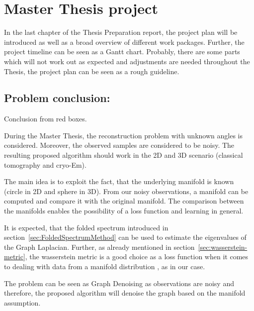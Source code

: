 \chapter{Master Thesis project}
\label{sec:projectOverview}
In the last chapter of the Thesis Preparation report, the project plan will be introduced as well as a broad overview of different 
work packages. Further, the project timeline can be seen as a Gantt chart.
Probably, there are some parts which will not work out as expected and 
adjustments are needed throughout the Thesis, the project plan can be seen as a rough guideline.

\section{Problem conclusion:}
Conclusion from red boxes.

During the Master Thesis, the reconstruction problem with unknown angles is considered. 
Moreover, the observed samples are considered to be noisy. 
The resulting proposed algorithm should work in the 2D and 3D scenario (classical tomography and cryo-Em).

The main idea is to exploit the fact, that the underlying manifold is known (circle in 2D and sphere in 3D). 
From our noisy observations, a manifold can be computed and compare it with the original manifold.
The comparison between the manifolds enables the possibility of a loss function and learning in general.

It is expected, that the folded spectrum \cite{foldedSpectrumMethod} introduced in section~\ref{sec:FoldedSpectrumMethod}
can be used to estimate the eigenvalues of the Graph Laplacian.
Further, as already mentioned in section~\ref{sec:wasserstein-metric}, the wasserstein metric is a good choice
as a loss function when it comes to dealing with data from a manifold distribution \cite{wassersteinGAN}, as in our case. 

The problem can be seen as Graph Denoising as observations are noisy and therefore, the proposed algorithm 
will denoise the graph based on the manifold assumption. 



